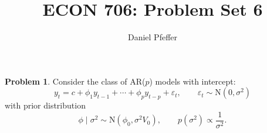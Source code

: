 \documentclass[oneside,reqno]{amsart}
\title{ECON 706: Problem Set 6}
\author{Daniel Pfeffer}
\newcommand{\eps}{\varepsilon}
\newcommand{\N}{\mathrm N}
\theoremstyle{definition}
\newtheorem{prob}{Problem}
\begin{document}
\maketitle

\begin{prob}
Consider the class of AR($p$) models with intercept: 
\begin{equation}\label{eq:arp}
	y_t =  c +\phi_1 y_{t-1} + \cdots + \phi_p y_{t-p} + \eps_t, 
	\qquad 
	\eps_t \sim \N(0, \sigma^2)
\end{equation}
with prior distribution 
\begin{equation}\label{eq:arp-prior}
	\phi \mid \sigma^2 \sim \N(\phi_0, \sigma^2 V_0),
	\qquad 
	p(\sigma^2) \propto \frac{1}{\sigma^2}. 
\end{equation}
\end{prob}
\end{document}
